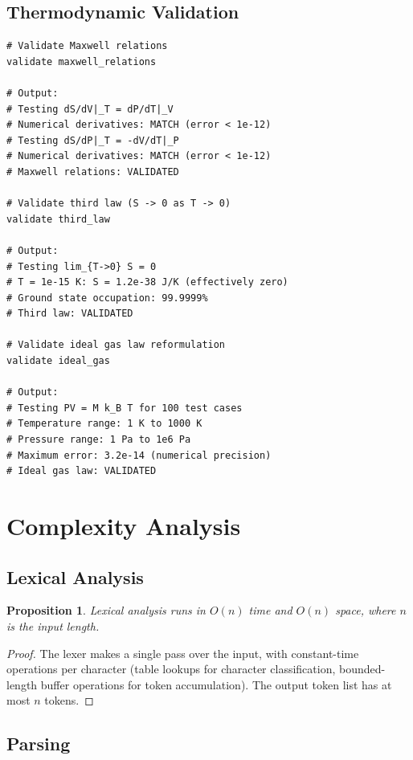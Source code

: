 \documentclass[twocolumn,10pt]{article}
\newtheorem{proposition}[theorem]{Proposition}
\begin{document}
\subsection{Thermodynamic Validation}

\begin{lstlisting}[caption={Thermodynamic identity validation}]
# Validate Maxwell relations
validate maxwell_relations

# Output:
# Testing dS/dV|_T = dP/dT|_V
# Numerical derivatives: MATCH (error < 1e-12)
# Testing dS/dP|_T = -dV/dT|_P
# Numerical derivatives: MATCH (error < 1e-12)
# Maxwell relations: VALIDATED

# Validate third law (S -> 0 as T -> 0)
validate third_law

# Output:
# Testing lim_{T->0} S = 0
# T = 1e-15 K: S = 1.2e-38 J/K (effectively zero)
# Ground state occupation: 99.9999%
# Third law: VALIDATED

# Validate ideal gas law reformulation
validate ideal_gas

# Output:
# Testing PV = M k_B T for 100 test cases
# Temperature range: 1 K to 1000 K
# Pressure range: 1 Pa to 1e6 Pa
# Maximum error: 3.2e-14 (numerical precision)
# Ideal gas law: VALIDATED
\end{lstlisting}

\section{Complexity Analysis}

\subsection{Lexical Analysis}

\begin{proposition}
Lexical analysis runs in $O(n)$ time and $O(n)$ space, where $n$ is the input length.
\end{proposition}

\begin{proof}
The lexer makes a single pass over the input, with constant-time operations per character (table lookups for character classification, bounded-length buffer operations for token accumulation). The output token list has at most $n$ tokens.
\end{proof}

\subsection{Parsing}
\end{document}
